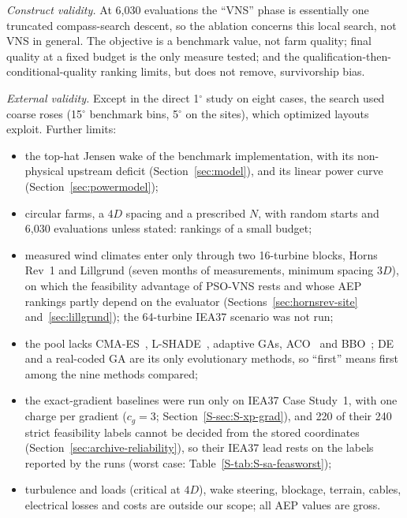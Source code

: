 \emph{Construct validity.} At 6,030 evaluations the ``VNS'' phase is essentially one truncated compass-search descent, so the ablation concerns this local search, not VNS in general. The objective is a benchmark value, not farm quality; final quality at a fixed budget is the only measure tested; and the qualification-then-conditional-quality ranking limits, but does not remove, survivorship bias.

\emph{External validity.} Except in the direct 1$^\circ$ study on eight cases, the search used coarse roses (15$^\circ$ benchmark bins, 5$^\circ$ on the sites), which optimized layouts exploit. Further limits:
\begin{itemize}
\item the top-hat Jensen wake of the benchmark implementation, with its non-physical upstream deficit (Section~\ref{sec:model}), and its linear power curve (Section~\ref{sec:powermodel});
\item circular farms, a $4D$ spacing and a prescribed $N$, with random starts and 6,030 evaluations unless stated: rankings of a small budget;
\item measured wind climates enter only through two 16-turbine blocks, Horns Rev~1 and Lillgrund (seven months of measurements, minimum spacing $3D$), on which the feasibility advantage of PSO-VNS rests and whose AEP rankings partly depend on the evaluator (Sections~\ref{sec:hornsrev-site} and~\ref{sec:lillgrund}); the 64-turbine IEA37 scenario was not run;
\item the pool lacks CMA-ES~\cite{HansenOstermeier2001}, L-SHADE~\cite{Tanabe2014}, adaptive GAs, ACO~\cite{Eroglu2012} and BBO~\cite{Bansal2017}; DE and a real-coded GA are its only evolutionary methods, so ``first'' means first among the nine methods compared;
\item the exact-gradient baselines were run only on IEA37 Case Study~1, with one charge per gradient ($c_g=3$; Section~\ref{S-sec:S-xp-grad}), and 220 of their 240 strict feasibility labels cannot be decided from the stored coordinates (Section~\ref{sec:archive-reliability}), so their IEA37 lead rests on the labels reported by the runs (worst case: Table~\ref{S-tab:S-sa-feasworst});
\item turbulence and loads (critical at $4D$), wake steering, blockage, terrain, cables, electrical losses and costs are outside our scope; all AEP values are gross.
\end{itemize}

